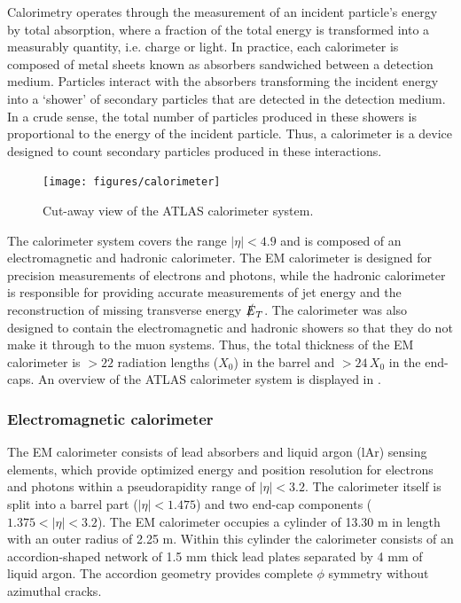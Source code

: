 Calorimetry operates through the measurement of an incident particle's energy
by total absorption, where a fraction of the total energy is transformed
into a measurably quantity, i.e. charge or light. In practice,
each calorimeter is composed of metal sheets known as absorbers sandwiched 
between a detection medium. Particles interact with the absorbers transforming
the incident energy into a `shower' of secondary particles that are detected
in the detection medium. In a crude sense, the total number of particles
produced in these showers is proportional to the energy of the incident particle.
Thus, a calorimeter is a device designed to count secondary particles 
produced in these interactions.

\begin{figure}[!hbpt]
  \centering
  \texttt{[image: figures/calorimeter]}
  \caption{Cut-away view of the ATLAS calorimeter system.}
  \label{fig:cal}
\end{figure}

The calorimeter system covers the range $|\eta| < 4.9$ and is composed of an
electromagnetic and hadronic calorimeter. The EM calorimeter is designed for
precision measurements of electrons and photons, while the hadronic calorimeter is
responsible for providing accurate measurements of jet energy and the reconstruction
of missing transverse energy $\slashed{E}_T$. The calorimeter was also designed
to contain the electromagnetic and hadronic showers so that they do not
make it through to the muon systems. Thus, the total thickness of the EM 
calorimeter is $> 22$ radiation lengths ($X_0$) in the barrel and $> 24\,X_0$
in the end-caps.
An overview of the ATLAS calorimeter system is displayed in .

\subsubsection*{Electromagnetic calorimeter}
The EM calorimeter consists of lead absorbers and liquid argon (lAr) sensing
elements, which provide optimized energy and position resolution for electrons
and photons within a pseudorapidity range of $|\eta| < 3.2$. The calorimeter
itself is split into a barrel part ($|\eta| < 1.475$) and two end-cap components
($1.375 < |\eta| < 3.2$). The EM calorimeter occupies a cylinder of 13.30 m in length
with an outer radius of 2.25 m.  Within this cylinder the calorimeter consists
of an accordion-shaped network of 1.5 mm thick lead plates separated 
by 4 mm of liquid argon. The accordion geometry provides complete $\phi$ symmetry
without azimuthal cracks.

